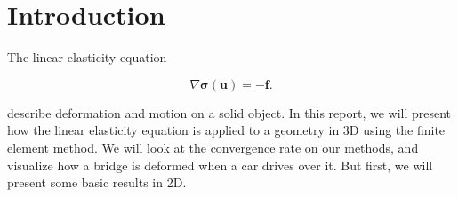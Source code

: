 \section{Introduction}



The linear elasticity equation

\begin{equation}
\label{eq:linEl}
\nabla \bm{\sigma}(\bm{u}) = - \bm{f}.
\end{equation}

describe deformation and motion on a solid object. In this report, we will present how the linear elasticity equation is applied to a geometry in 3D using the finite element method. We will look at the convergence rate on our methods, and visualize how a bridge is deformed when a car drives over it. But first, we will present some basic results in 2D. 